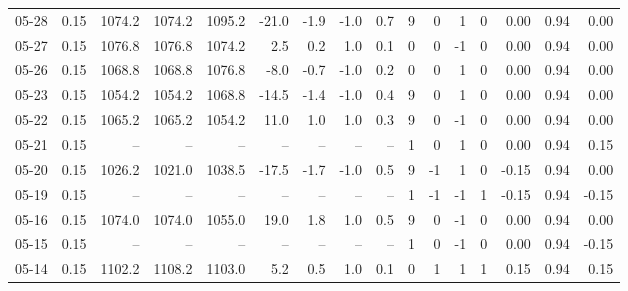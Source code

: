 \begin{threeparttable}
{\begin{tabular}{lrrrrrrrrrrrrrrr}
  05-28 &     0.15 & 1074.2 & 1074.2 & 1095.2 &      -21.0 &           -1.9 &                     -1.0 &                 0.7 &              9 &         0 &     1 &         0 &       0.00 &      0.94 &           0.00 \\
  05-27 &     0.15 & 1076.8 & 1076.8 & 1074.2 &        2.5 &            0.2 &                      1.0 &                 0.1 &              0 &         0 &    -1 &         0 &       0.00 &      0.94 &           0.00 \\
  05-26 &     0.15 & 1068.8 & 1068.8 & 1076.8 &       -8.0 &           -0.7 &                     -1.0 &                 0.2 &              0 &         0 &     1 &         0 &       0.00 &      0.94 &           0.00 \\
  05-23 &     0.15 & 1054.2 & 1054.2 & 1068.8 &      -14.5 &           -1.4 &                     -1.0 &                 0.4 &              9 &         0 &     1 &         0 &       0.00 &      0.94 &           0.00 \\
  05-22 &     0.15 & 1065.2 & 1065.2 & 1054.2 &       11.0 &            1.0 &                      1.0 &                 0.3 &              9 &         0 &    -1 &         0 &       0.00 &      0.94 &           0.00 \\
  05-21 &     0.15 &     -- &     -- &     -- &         -- &             -- &                       -- &                  -- &              1 &         0 &     1 &         0 &       0.00 &      0.94 &           0.15 \\
  05-20 &     0.15 & 1026.2 & 1021.0 & 1038.5 &      -17.5 &           -1.7 &                     -1.0 &                 0.5 &              9 &        -1 &     1 &         0 &      -0.15 &      0.94 &           0.00 \\
  05-19 &     0.15 &     -- &     -- &     -- &         -- &             -- &                       -- &                  -- &              1 &        -1 &    -1 &         1 &      -0.15 &      0.94 &          -0.15 \\
  05-16 &     0.15 & 1074.0 & 1074.0 & 1055.0 &       19.0 &            1.8 &                      1.0 &                 0.5 &              9 &         0 &    -1 &         0 &       0.00 &      0.94 &           0.00 \\
  05-15 &     0.15 &     -- &     -- &     -- &         -- &             -- &                       -- &                  -- &              1 &         0 &    -1 &         0 &       0.00 &      0.94 &          -0.15 \\
  05-14 &     0.15 & 1102.2 & 1108.2 & 1103.0 &        5.2 &            0.5 &                      1.0 &                 0.1 &              0 &         1 &     1 &         1 &       0.15 &      0.94 &           0.15 \\

\end{tabular}}
\end{threeparttable}
